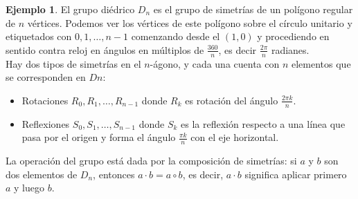 \documentclass[12pt]{book}
\theoremstyle{definition}
\newtheorem{example}[theorem]{Ejemplo}
\newcounter{in}
\begin{document}
\begin{example}
\label{rep_die}
El grupo diédrico $D_{n}$ es el grupo de simetrías de un polígono regular de $n$ vértices. Podemos ver los vértices de este polígono sobre el círculo unitario y etiquetados con $0,1,\ldots,n-1$ comenzando desde el $(1, 0)$ y procediendo en sentido contra reloj en ángulos en múltiplos de $\frac{360}{n}$, es decir $\frac{2 \pi}{n}$ radianes.\\
Hay dos tipos de simetrías en el $n$-ágono, y cada una cuenta con $n$ elementos que se corresponden en $D{n}$:
\begin{itemize}
\item Rotaciones $R_{0}, R_{1}, \ldots, R_{n-1}$ donde $R_{k}$ es rotación del ángulo $\frac{2 \pi k}{n}$.
\item Reflexiones $S_{0}, S_{1}, \ldots, S_{n-1}$ donde $S_{k}$ es la reflexión respecto a una línea que pasa por el origen y forma el ángulo $\frac{\pi k}{n}$ con el eje horizontal.
\end{itemize}
La operación del grupo está dada por la composición de simetrías: si $a$ y $b$ son dos elementos de $D_{n}$, entonces $a \cdot b = a \circ b$, es decir, $a \cdot b$ significa aplicar primero $a$ y luego $b$.


\end{example}
\end{document}
